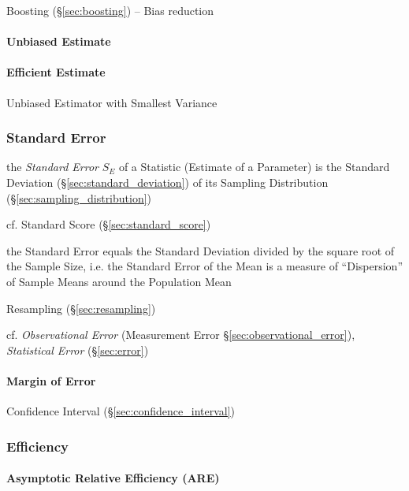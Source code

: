 Boosting (\S\ref{sec:boosting}) -- Bias reduction



\paragraph{Unbiased Estimate}\label{sec:unbiased_estimate}\hfill

\paragraph{Efficient Estimate}\label{sec:efficient_estimate}\hfill

Unbiased Estimator with Smallest Variance



\subsubsection{Standard Error}\label{sec:standard_error}

the \emph{Standard Error} $S_E$ of a Statistic (Estimate of a Parameter) is the
Standard Deviation (\S\ref{sec:standard_deviation}) of its Sampling Distribution
(\S\ref{sec:sampling_distribution})

cf. Standard Score (\S\ref{sec:standard_score})

the Standard Error equals the Standard Deviation divided by the square root of
the Sample Size, i.e. the Standard Error of the Mean is a measure of
``Dispersion'' of Sample Means around the Population Mean

\fist Resampling (\S\ref{sec:resampling})

\fist cf. \emph{Observational Error} (Measurement Error
\S\ref{sec:observational_error}), \emph{Statistical Error} (\S\ref{sec:error})



\paragraph{Margin of Error}\label{sec:margin_of_error}\hfill

\fist Confidence Interval (\S\ref{sec:confidence_interval})



\subsubsection{Efficiency}\label{sec:efficiency}

\paragraph{Asymptotic Relative Efficiency (ARE)}\label{sec:are}\hfill

